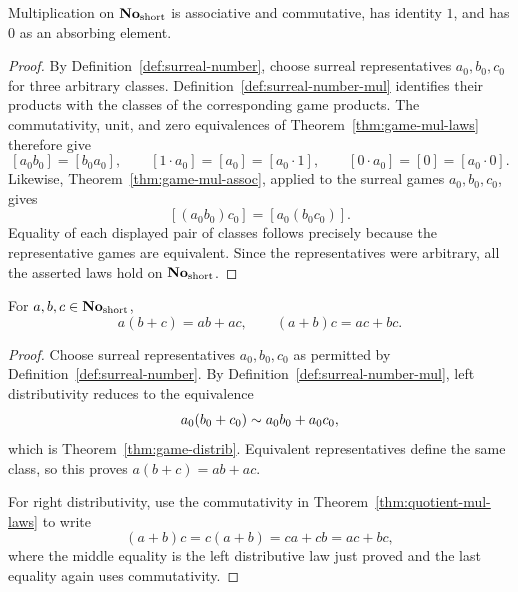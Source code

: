 \begin{theorem}
  \label{thm:quotient-mul-laws}
  \leanok
  Multiplication on \(\mathbf{No}_{\mathrm{short}}\) is associative and commutative, has identity \(1\), and has
  \(0\) as an absorbing element.
\end{theorem}
\begin{proof}
  \leanok
  By Definition~\ref{def:surreal-number}, choose surreal representatives
  \(a_0,b_0,c_0\) for three arbitrary classes.  Definition~\ref{def:surreal-number-mul}
  identifies their products with the classes of the corresponding game
  products.  The commutativity, unit, and zero equivalences of
  Theorem~\ref{thm:game-mul-laws} therefore give
  \[
    [a_0b_0]=[b_0a_0],\qquad [1\cdot a_0]=[a_0]=[a_0\cdot1],
    \qquad [0\cdot a_0]=[0]=[a_0\cdot0].
  \]
  Likewise, Theorem~\ref{thm:game-mul-assoc}, applied to the surreal games
  \(a_0,b_0,c_0\), gives
  \[
    [(a_0b_0)c_0]=[a_0(b_0c_0)].
  \]
  Equality of each displayed pair of classes follows precisely because the
  representative games are equivalent.  Since the representatives were
  arbitrary, all the asserted laws hold on \(\mathbf{No}_{\mathrm{short}}\).
\end{proof}

\begin{theorem}
  \label{thm:quotient-distrib}
  \leanok
  For \(a,b,c\in\mathbf{No}_{\mathrm{short}}\),
  \[
    a(b+c)=ab+ac,
    \qquad
    (a+b)c=ac+bc.
  \]
\end{theorem}
\begin{proof}
  \leanok
  Choose surreal representatives \(a_0,b_0,c_0\) as permitted by
  Definition~\ref{def:surreal-number}.  By
  Definition~\ref{def:surreal-number-mul}, left distributivity reduces to the
  equivalence
  \[
    a_0(b_0+c_0)\sim a_0b_0+a_0c_0,
  \]
  which is Theorem~\ref{thm:game-distrib}.  Equivalent representatives define
  the same class, so this proves \(a(b+c)=ab+ac\).

  For right distributivity, use the commutativity in
  Theorem~\ref{thm:quotient-mul-laws} to write
  \[
    (a+b)c=c(a+b)=ca+cb=ac+bc,
  \]
  where the middle equality is the left distributive law just proved and the
  last equality again uses commutativity.
\end{proof}

